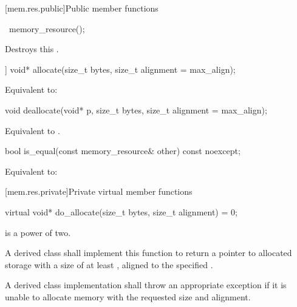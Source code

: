 [mem.res.public]{Public member functions}

%
\begin{itemdecl}
~memory_resource();
\end{itemdecl}

\begin{itemdescr}
\pnum
\effects
Destroys this .
\end{itemdescr}

%
\begin{itemdecl}
[[nodiscard]] void* allocate(size_t bytes, size_t alignment = max_align);
\end{itemdecl}

\begin{itemdescr}
\pnum
\effects
Equivalent to: 
\end{itemdescr}

%
\begin{itemdecl}
void deallocate(void* p, size_t bytes, size_t alignment = max_align);
\end{itemdecl}

\begin{itemdescr}
\pnum
\effects
Equivalent to .
\end{itemdescr}

%
\begin{itemdecl}
bool is_equal(const memory_resource& other) const noexcept;
\end{itemdecl}

\begin{itemdescr}
\pnum
\effects
Equivalent to: 
\end{itemdescr}


[mem.res.private]{Private virtual member functions}

%
\begin{itemdecl}
virtual void* do_allocate(size_t bytes, size_t alignment) = 0;
\end{itemdecl}

\begin{itemdescr}
\pnum
\expects
{} is a power of two.

\pnum
\returns
A derived class shall implement this function to
return a pointer to allocated storage
with a size of at least ,
aligned to the specified .

\pnum
\throws
A derived class implementation shall throw an appropriate exception if it is unable to allocate memory with the requested size and alignment.
\end{itemdescr}

